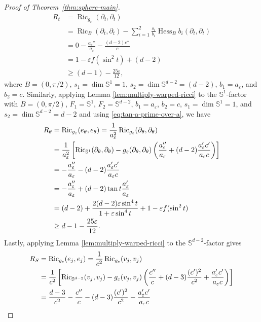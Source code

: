 \documentclass[11pt,reqno]{amsart}
\numberwithin{equation}{section}
\theoremstyle{definition}
\theoremstyle{remark}
\newcommand{\0}{\emptyset}
\newcommand{\veps}{\varepsilon}
\newcommand{\bbS}{\mathbb S}
\newcommand{\Ric}{\operatorname{Ric}}
\begin{document}
\begin{proof}[Proof of Theorem~\ref{thm:sphere-main}]
\begin{align}
 R_t &= \operatorname{Ric}_{g_{\veps}}(\partial_t, \partial_t) \\
 &= \Ric_{B}(\partial_t,\partial_t) - \sum_{i=1}^2 \frac{s_i}{b_i}\operatorname{Hess}_{B}b_i(\partial_t,\partial_t)\\
 &= 0 - \frac{a_\veps''}{a_\veps}-\frac{(d-2)c''}{c} \\
 &= 1-\veps f(\sin^2 t) + (d-2) \\
 &\geq (d-1) -\frac{25\veps}{12}, 
\end{align}
where $B=(0,\pi/2)$, $s_1=\operatorname{dim} \bbS^1=1$, $s_2=\dim \bbS^{d-2}=(d-2)$, $b_1=a_\veps$, and $b_2=c$. Similarly, applying Lemma \ref{lem:multiply-warped-ricci}  to the
\(\bbS^1\)-factor with \(B=(0,\pi/2)\), \(F_1=\bbS^1\), \(F_2=\bbS^{d-2}\),
\(b_1=a_\veps\), \(b_2=c\), \(s_1=\dim\bbS^1=1\), and
\(s_2=\dim\bbS^{d-2}=d-2\) and using \eqref{eq:tan-a-prime-over-a}, we have
\begin{align}
    R_\theta
    &=
    \Ric_{g_\veps}(e_\theta,e_\theta) =
    \frac{1}{a_\veps^2}
    \Ric_{g_\veps}(\partial_\theta,\partial_\theta) \notag\\
    &=
    \frac{1}{a_\veps^2}
    \left[
    \Ric_{\bbS^1}(\partial_\theta,\partial_\theta)
    -
    g_\veps(\partial_\theta,\partial_\theta)
    \left(
    \frac{a_\veps''}{a_\veps}
    +
    (d-2)\frac{a_\veps'c'}{a_\veps c}
    \right)
    \right] \notag\\
    &=
    -\frac{a_\veps''}{a_\veps}
    -(d-2)\frac{a_\veps'c'}{a_\veps c} \notag\\
    &=
    -\frac{a_\veps''}{a_\veps}
    +(d-2)\tan t \frac{a_\veps'}{a_\veps} \notag\\
    &=
    (d-2)
    +
    \frac{2(d-2)\veps \sin^4 t}{1+\veps \sin^4 t}
    +
    1
    -
    \veps f(\sin^2 t) \notag\\
    &\geq d-1-\frac{25\veps}{12}.
\end{align}
Lastly, applying Lemma
\ref{lem:multiply-warped-ricci} to the \(\bbS^{d-2}\)-factor gives
\begin{align}
    R_S
    &=
    \Ric_{g_\veps}(e_j,e_j) =
    \frac{1}{c^2}\Ric_{g_\veps}(v_j,v_j) \notag\\
    &=
    \frac{1}{c^2}
    \left[
    \Ric_{\bbS^{d-2}}(v_j,v_j)
    -
    g_\veps(v_j,v_j)
    \left(
    \frac{c''}{c}
    +
    (d-3)\frac{(c')^2}{c^2}
    +
    \frac{a_\veps'c'}{a_\veps c}
    \right)
    \right] \notag\\
    &=
    \frac{d-3}{c^2}
    -\frac{c''}{c}
    -(d-3)\frac{(c')^2}{c^2}
    -\frac{a_\veps'c'}{a_\veps c} \notag\\

\end{align}
\end{proof}
\end{document}
